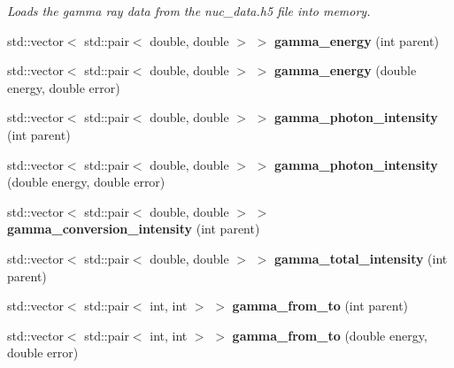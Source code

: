 \begin{DoxyCompactItemize}
\begin{DoxyCompactList}\small\item\em Loads the gamma ray data from the nuc\+\_\+data.\+h5 file into memory. \end{DoxyCompactList}\item 
std\+::vector$<$ std\+::pair$<$ double, double $>$ $>$ {\bfseries gamma\+\_\+energy} (int parent)\hypertarget{namespacepyne_a06f0af84c68fa27a8c2b091f1018fbf7}{}\label{namespacepyne_a06f0af84c68fa27a8c2b091f1018fbf7}

\item 
std\+::vector$<$ std\+::pair$<$ double, double $>$ $>$ {\bfseries gamma\+\_\+energy} (double energy, double error)\hypertarget{namespacepyne_ae9c513347dbf555ae036671b9e606ff3}{}\label{namespacepyne_ae9c513347dbf555ae036671b9e606ff3}

\item 
std\+::vector$<$ std\+::pair$<$ double, double $>$ $>$ {\bfseries gamma\+\_\+photon\+\_\+intensity} (int parent)\hypertarget{namespacepyne_af6550cdd1953ef1b6765c756cb8dbd8a}{}\label{namespacepyne_af6550cdd1953ef1b6765c756cb8dbd8a}

\item 
std\+::vector$<$ std\+::pair$<$ double, double $>$ $>$ {\bfseries gamma\+\_\+photon\+\_\+intensity} (double energy, double error)\hypertarget{namespacepyne_aed619424ed24f8e57b0cd1adf5e3cd5e}{}\label{namespacepyne_aed619424ed24f8e57b0cd1adf5e3cd5e}

\item 
std\+::vector$<$ std\+::pair$<$ double, double $>$ $>$ {\bfseries gamma\+\_\+conversion\+\_\+intensity} (int parent)\hypertarget{namespacepyne_aecfb315cfddf396d32d23b0cc5cc1958}{}\label{namespacepyne_aecfb315cfddf396d32d23b0cc5cc1958}

\item 
std\+::vector$<$ std\+::pair$<$ double, double $>$ $>$ {\bfseries gamma\+\_\+total\+\_\+intensity} (int parent)\hypertarget{namespacepyne_af27fabc2e6cae361e977993a84c67ac2}{}\label{namespacepyne_af27fabc2e6cae361e977993a84c67ac2}

\item 
std\+::vector$<$ std\+::pair$<$ int, int $>$ $>$ {\bfseries gamma\+\_\+from\+\_\+to} (int parent)\hypertarget{namespacepyne_ab7c78ce8ef6b2242b1b91e4b044b75b1}{}\label{namespacepyne_ab7c78ce8ef6b2242b1b91e4b044b75b1}

\item 
std\+::vector$<$ std\+::pair$<$ int, int $>$ $>$ {\bfseries gamma\+\_\+from\+\_\+to} (double energy, double error)\hypertarget{namespacepyne_aadaed97b885de370c1a7361a39079021}{}\label{namespacepyne_aadaed97b885de370c1a7361a39079021}


\end{DoxyCompactItemize}
